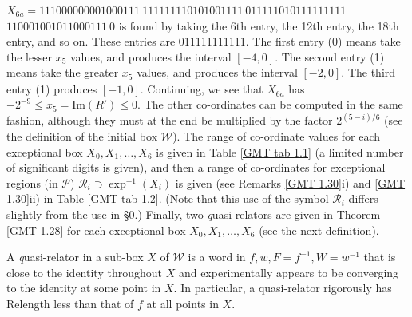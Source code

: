 \begin{remark}
\noindent 
$X_{6a} = 
111000000001000111\ 
111111110101001111\ 
011111010111111111$\hfill
{}
  \hfill $  
110001001011000111\ 0$
\vglue4pt\noindent 
is found by taking the 6th entry, the 12th entry, the 18th entry, and so on.  These entries are 011111111111.  The first entry (0) means take the
lesser $x_5$ values, and produces the interval $[-4,0].$  The second entry (1) means take the greater $x_5$ values, and produces the interval
$[-2,0].$  The third entry (1) produces $[-1,0].$  Continuing, we see that $X_{6a}^{\phantom{|}}$ has $-2^{-9} \le x_5 = \mathrm {Im}(R') \le 0.$  The other
co-ordinates can be computed in the same fashion, although they must at the end be multiplied by the factor $2^{(5 - i)/6}$ (see the definition of the
initial box
$\mathcal {W}$).  The range of co-ordinate values for each  exceptional  box $X_0, X_1, \ldots, X_6$ is given in Table \ref{GMT tab 1.1} (a limited number of significant
digits is given), and  then a range of co-ordinates for exceptional regions (in $\mathcal {P}$) 
$\mathcal {R}_i \supset \exp^{-1}(X_i)$ is given (see
Remarks \ref{GMT 1.30}i) and \ref{GMT 1.30}ii)
in Table \ref{GMT tab 1.2}. (Note that this use of the symbol $\mathcal {R}_i$ differs
slightly from the use in \S 0.)
Finally, two {\textit quasi-relators} are given in Theorem \ref{GMT 1.28} for each exceptional box $X_0, X_1, \ldots, X_6$ (see the next definition).\end{remark}
 
\begin{definition} \label{GMT 1.27} A {\textit quasi-relator} in a sub-box $X$ of $\mathcal {W}$ is a word in $f,w,F=f^{-1},W=w^{-1}$ that is close to the identity
throughout
$X$ and experimentally appears to be converging to the identity at some point in $X.$  In particular, a quasi-relator rigorously has Relength less than
that of $f$ at all points in $X.$
\end{definition}

